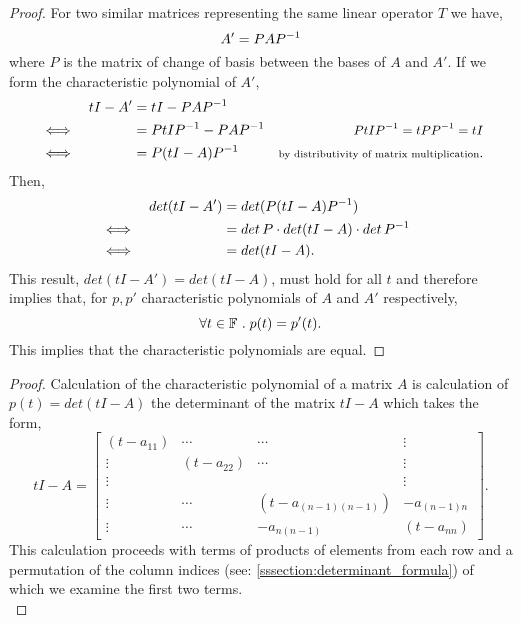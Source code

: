 \documentclass[MathsNotesBase.tex]{subfiles}
\begin{document}
{		\bigskip
		\begin{proof}
			For two similar matrices representing the same linear operator $T$ we have,
			\[ A' = PA{P}^{-1} \]
			where $P$ is the matrix of change of basis between the bases of $A$ and $A'$. If we form the characteristic polynomial of $A'$,
			\begin{align*}
			&& tI - A' &= tI - PA{P}^{-1} \\
			&\iff &  &= PtI{P}^{-1} - PA{P}^{-1} &\text{\scriptsize{\small{${ PtI{P}^{-1} = tP{P}^{-1} = tI }$}}} \\
			&\iff &  &= P(tI - A){P}^{-1} &\text{\scriptsize{by distributivity of matrix multiplication}}. \\
			\end{align*}
			Then,
			\begin{align*}
			&& det(tI - A') &= det(P(tI - A){P}^{-1}) \\
			&\iff &  &= det\,P \cdot det(tI - A) \cdot det\,{P}^{-1} & \\
			&\iff &  &= det(tI - A). & \\
			\end{align*}
			This result, ${ det(tI - A') = det(tI - A) }$, must hold for all $t$ and therefore implies that, for $p,p'$ characteristic polynomials of $A$ and $A'$ respectively,
			\[ \forall t \in \mathbb{F}^{} \;.\; p(t) = p'(t). \]
			This implies that the characteristic polynomials are equal.
		\end{proof}
	
		\bigskip
		\begin{proof}
			Calculation of the characteristic polynomial of a matrix $A$ is calculation of ${ p(t) = det(tI - A) }$ the determinant of the matrix ${ tI - A }$ which takes the form,
			\[
				tI - A = \begin{bmatrix}
						(t - a_{11}) & \cdots & \cdots 			   & \vdots\\
						\vdots & (t - a_{22}) & \cdots 			   & \vdots\\
						\vdots &   			&  					   & \vdots\\
						\vdots & \cdots 	& (t - a_{(n-1)(n-1)}) & -a_{(n-1)n}\\
						\vdots & \cdots 	& -a_{n(n-1)} 		   & (t - a_{nn})
						\end{bmatrix}.
			\]
			This calculation proceeds with terms of products of elements from each row and a permutation of the column indices (see: \ref{sssection:determinant_formula}) of which we examine the first two terms.\\
			

\end{proof}}
\end{document}
